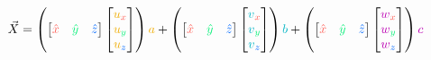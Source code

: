 \documentclass[preview]{standalone}
\begin{document}
$$\vec{X} =
\left(\begin{bmatrix}\textcolor[HTML]{fe5e56}{\hat{x}}&\textcolor[HTML]{00ef75}{\hat{y}}&\textcolor[HTML]{0069fe}{\hat{z}}\end{bmatrix}\begin{bmatrix}\textcolor[HTML]{efac00}{u}_{\textcolor[HTML]{fe5e56}{x}}\\\textcolor[HTML]{efac00}{u}_{\textcolor[HTML]{00ef75}{y}}\\\textcolor[HTML]{efac00}{u}_{\textcolor[HTML]{0069fe}{z}}\end{bmatrix}\right)\textcolor[HTML]{efac00}{a} +
\left(\begin{bmatrix}\textcolor[HTML]{fe5e56}{\hat{x}}&\textcolor[HTML]{00ef75}{\hat{y}}&\textcolor[HTML]{0069fe}{\hat{z}}\end{bmatrix}\begin{bmatrix}\textcolor[HTML]{00b4c4}{v}_{\textcolor[HTML]{fe5e56}{x}}\\\textcolor[HTML]{00b4c4}{v}_{\textcolor[HTML]{00ef75}{y}}\\\textcolor[HTML]{00b4c4}{v}_{\textcolor[HTML]{0069fe}{z}}\end{bmatrix}\right)\textcolor[HTML]{00b4c4}{b} +
\left(\begin{bmatrix}\textcolor[HTML]{fe5e56}{\hat{x}}&\textcolor[HTML]{00ef75}{\hat{y}}&\textcolor[HTML]{0069fe}{\hat{z}}\end{bmatrix}\begin{bmatrix}\textcolor[HTML]{ba00b2}{w}_{\textcolor[HTML]{fe5e56}{x}}\\\textcolor[HTML]{ba00b2}{w}_{\textcolor[HTML]{00ef75}{y}}\\\textcolor[HTML]{ba00b2}{w}_{\textcolor[HTML]{0069fe}{z}}\end{bmatrix}\right)\textcolor[HTML]{ba00b2}{c}$$
\end{document}
